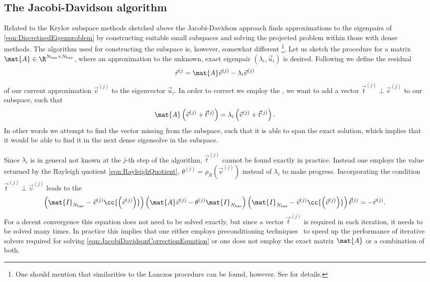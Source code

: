 \subsection{The Jacobi-Davidson algorithm}
\label{sec:Davidson}
Related to the Krylov subspace methods
sketched above the Jacobi-Davidson approach
finds approximations to the eigenpairs of \eqref{eqn:DiscretisedEigenproblem}
by constructing suitable small subspaces
and solving the projected problem within those with dense methods.
The algorithm used for constructing the subspace is, however,
somewhat different%
\footnote{One should mention that similarities to the Lanczos procedure
	can be found, however. See \cite{Arbenz2010} for details.}.
Let us sketch the procedure for a matrix $\mat{A} \in \R^{\Nbas \times \Nbas}$,
where an approximation to the unknown, exact eigenpair $(\lambda_i, \vec{u}_i)$
is desired.
Following \citet{Davidson1975} we define the residual
\begin{equation}
	\vec{r}^{(j} = \mat{A} \vec{v}^{(j)} - \lambda_i \vec{v}^{(j)}
	\label{eqn:DavidsonResidual}
\end{equation}
of our current approximation $\vec{v}^{(j)}$ to the eigenvector $\vec{u}_i$.
In order to correct we employ the
,
\ie we want to add a vector $\vec{t}^{(j)} \perp \vec{v}^{(j)}$ to our
subspace, such that
\[
	\mat{A} \left(\vec{v}^{(j)} + \vec{t}^{(j)}\right) = \lambda_i \left(\vec{v}^{(j)} + \vec{t}^{(j)}\right).
\]
In other words we attempt to find the vector missing from the subspace,
such that it is able to span the exact solution,
which implies that it would be able to find it in the next dense
eigensolve in the subspace.

Since $\lambda_i$ is in general not known at the $j$-th step of the algorithm,
$\vec{t}^{(j)}$ cannot be found exactly in practice.
Instead one employs the value returned by the Rayleigh quotient
\eqref{eqn:RayleighQuotient},
\ie
$\theta^{(j)} = \rho_R\left(\vec{v}^{(j)}\right)$
instead of $\lambda_i$ to make progress.
Incorporating the condition $\vec{t}^{(j)} \perp \vec{v}^{(j)}$ leads to the
\begin{equation}
	\left(\mat{I}_{\Nbas} - \vec{v}^{(j)} \cc{\left(\vec{v}^{(j)}\right)} \right)
	\left(\mat{A} \vec{v}^{(j)} - \theta^{(j)} \mat{I}_{\Nbas}\right)
	\left(\mat{I}_{\Nbas} - \vec{v}^{(j)} \cc{\left(\vec{v}^{(j)}\right)} \right)
	\vec{t}^{(j)}
	= - \vec{r}^{(j)}.
	\label{eqn:JacobiDavidsonCorrectionEquation}
\end{equation}
For a decent convergence this equation does not need to be solved exactly,
but since a vector $\vec{t}^{(j)}$ is required
in each iteration,
it needs to be solved many times.
In practice this implies that one either
employs preconditioning techniques~\cite{Saad2003,Saad2011,Arbenz2010,Grossmann1992}
to speed up the performance of iterative solvers
required for solving \eqref{eqn:JacobiDavidsonCorrectionEquation}
or one does not employ the exact matrix $\mat{A}$
or a combination of both.

